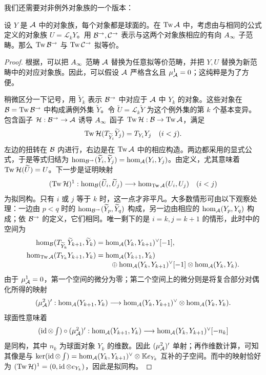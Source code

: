 我们还需要对非例外对象族的一个版本：
\begin{lemma}\label{st:5.23}
设 $Y$ 是 $\mathcal A$ 中的对象族，每个对象都是球面的。在 $\operatorname{Tw}\mathcal A$ 中，考虑由与相同的公式定义的对象族 $U=\mathscr L_kY$。用 $\mathcal B^{\to},\mathcal C^{\to}$ 表示与这两个对象族相应的有向 $A_\infty$ 子范畴。那么 $\operatorname{Tw}\mathcal B^{\to}$ 与 $\operatorname{Tw}\mathcal C^{\to}$ 拟等价。
\end{lemma}
\begin{proof}
根据，可以把 $A_\infty$ 范畴 $\mathcal A$ 替换为任意拟等价范畴，并把 $Y,U$ 替换为新范畴中的对应对象族。因此，可以假设 $\mathcal A$ 严格含幺且 $\mu^1_{\mathcal A}=0$；这纯粹是为了方便。

稍微区分一下记号，用 $\widetilde Y_k$ 表示 $\mathcal B^{\to}$ 中对应于 $\mathcal A$ 中 $Y_k$ 的对象。这些对象在 $\mathcal B=\operatorname{Tw}\mathcal B^{\to}$ 中构成满例外集 $\widetilde Y$。令 $\widetilde U=\mathscr L_k\widetilde Y$ 为这个例外集的第 $k$ 个基本变异。包含函子 $\mathcal H:\mathcal B^{\to}\to\mathcal A$ 诱导 $A_\infty$ 函子 $\operatorname{Tw}\mathcal H:\mathcal B\to\operatorname{Tw}\mathcal A$，满足
\begin{equation}\label{eq:5.33}
\operatorname{Tw}\mathcal H(T_{\widetilde Y_i}\widetilde Y_j)=T_{Y_i}Y_j\quad(i<j).
\end{equation}
左边的扭转在 $\mathcal B$ 内进行，右边是在 $\operatorname{Tw}\mathcal A$ 中的相应构造。两边都采用的显式公式，于是等式归结为 $\hom_{\mathcal B^{\to}}(\widetilde Y_i,\widetilde Y_j)=\hom_{\mathcal A}(Y_i,Y_j)$。由定义，尤其意味着 $\operatorname{Tw}\mathcal H(\widetilde U)=U$。下一步是证明映射
\begin{equation}\label{eq:5.34}
(\operatorname{Tw}\mathcal H)^1:\hom_{\mathcal B}(\widetilde U_i,\widetilde U_j)\longrightarrow\hom_{\operatorname{Tw}\mathcal A}(U_i,U_j)\quad(i<j)
\end{equation}
为拟同构。只有 $i$ 或 $j$ 等于 $k$ 时，这一点才非平凡。大多数情形可由以下观察处理：一边由 $p<q$ 时的 $\hom_{\mathcal B^{\to}}(\widetilde Y_p,\widetilde Y_q)$ 构成，另一边由相应的 $\hom_{\mathcal A}(Y_p,Y_q)$ 构成；依 $\mathcal B^{\to}$ 的定义，它们相同。唯一剩下的是 $i=k,j=k+1$ 的情形，此时中的空间为
\[
\begin{aligned}
\hom_{\mathcal B}(T_{\widetilde Y_k}\widetilde Y_{k+1},\widetilde Y_k)&=\hom_{\mathcal A}(Y_k,Y_{k+1})^{\vee}[-1],\\
\hom_{\operatorname{Tw}\mathcal A}(T_{Y_k}Y_{k+1},Y_k)&=\hom_{\mathcal A}(Y_{k+1},Y_k)\\[-2pt]
&\qquad\oplus\hom_{\mathcal A}(Y_k,Y_{k+1})^{\vee}[-1]\otimes\hom_{\mathcal A}(Y_k,Y_k).
\end{aligned}
\]
由于 $\mu^1_{\mathcal A}=0$，第一个空间的微分为零；第二个空间上的微分则是将复合部分对偶化所得的映射
\[
(\mu^2_{\mathcal A})':\hom_{\mathcal A}(Y_{k+1},Y_k)\longrightarrow\hom_{\mathcal A}(Y_k,Y_{k+1})^{\vee}\otimes\hom_{\mathcal A}(Y_k,Y_k).
\]
球面性意味着
\[
(\operatorname{id}\otimes\textstyle\int)\circ(\mu^2_{\mathcal A})':\hom_{\mathcal A}(Y_{k+1},Y_k)\longrightarrow\hom_{\mathcal A}(Y_k,Y_{k+1})^{\vee}[-n_k]
\]
是同构，其中 $n_k$ 为球面对象 $Y_k$ 的维数。因此 $(\mu^2_{\mathcal A})'$ 单射；再作维数计算，可知其像是与 $\ker(\operatorname{id}\otimes\int)=\hom_{\mathcal A}(Y_k,Y_{k+1})^{\vee}\otimes\mathbb K e_{Y_k}$ 互补的子空间。而中的映射恰好为 $(\operatorname{Tw}\mathcal H)^1=(0,\operatorname{id}\otimes e_{Y_k})$，因此是拟同构。


\end{proof}
